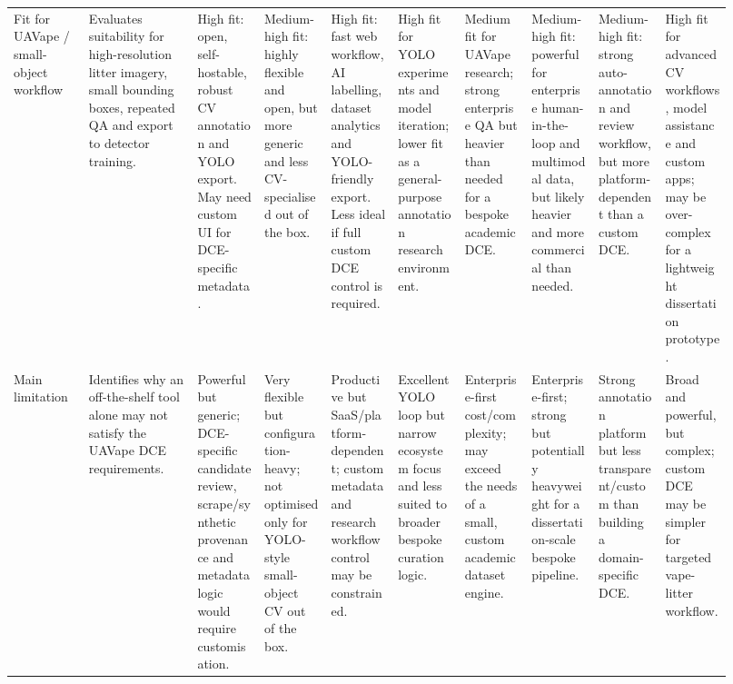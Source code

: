 \begin{landscape}
\begin{longtable}{@{}Y{0.09\linewidth}Y{0.13\linewidth}Y{0.087\linewidth}Y{0.087\linewidth}Y{0.087\linewidth}Y{0.087\linewidth}Y{0.087\linewidth}Y{0.087\linewidth}Y{0.087\linewidth}Y{0.087\linewidth}@{}}
Fit for UAVape / small-object workflow &
Evaluates suitability for high-resolution litter imagery, small bounding boxes, repeated QA and export to detector training. &
High fit: open, self-hostable, robust CV annotation and YOLO export. May need custom UI for DCE-specific metadata. &
Medium-high fit: highly flexible and open, but more generic and less CV-specialised out of the box. &
High fit: fast web workflow, AI labelling, dataset analytics and YOLO-friendly export. Less ideal if full custom DCE control is required. &
High fit for YOLO experiments and model iteration; lower fit as a general-purpose annotation research environment. &
Medium fit for UAVape research; strong enterprise QA but heavier than needed for a bespoke academic DCE. &
Medium-high fit: powerful for enterprise human-in-the-loop and multimodal data, but likely heavier and more commercial than needed. &
Medium-high fit: strong auto-annotation and review workflow, but more platform-dependent than a custom DCE. &
High fit for advanced CV workflows, model assistance and custom apps; may be over-complex for a lightweight dissertation prototype. \\

Main limitation &
Identifies why an off-the-shelf tool alone may not satisfy the UAVape DCE requirements. &
Powerful but generic; DCE-specific candidate review, scrape/synthetic provenance and metadata logic would require customisation. &
Very flexible but configuration-heavy; not optimised only for YOLO-style small-object CV out of the box. &
Productive but SaaS/platform-dependent; custom metadata and research workflow control may be constrained. &
Excellent YOLO loop but narrow ecosystem focus and less suited to broader bespoke curation logic. &
Enterprise-first cost/complexity; may exceed the needs of a small, custom academic dataset engine. &
Enterprise-first; strong but potentially heavyweight for a dissertation-scale bespoke pipeline. &
Strong annotation platform but less transparent/custom than building a domain-specific DCE. &
Broad and powerful, but complex; custom DCE may be simpler for targeted vape-litter workflow. \\

\end{longtable}
\end{landscape}

\normalsize
